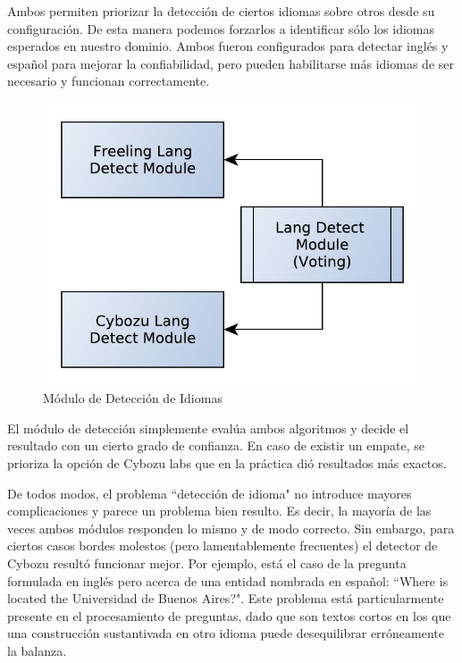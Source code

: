 Ambos permiten priorizar la detección de ciertos idiomas sobre otros desde su configuración.
De esta manera podemos forzarlos a identificar sólo los idiomas esperados en nuestro dominio. 
Ambos fueron configurados para detectar inglés y español para mejorar la confiabilidad,
pero pueden habilitarse más idiomas de ser necesario y funcionan correctamente. 

\begin{figure}
  \centering
    \includegraphics[scale=0.5]{graficos/LangDetect}
  \caption{Módulo de Detección de Idiomas}
  \label{fig:LangDetect}
\end{figure}


El módulo de detección simplemente evalúa ambos algoritmos y 
decide el resultado con un cierto grado de confianza. En caso de existir un empate, se 
prioriza la opción de Cybozu labs que en la práctica dió resultados más exactos.

De todos modos, el problema ``detección de idioma" no introduce mayores complicaciones y parece un problema bien resulto.
Es decir, la mayoría de las veces ambos módulos responden lo mismo y de modo correcto.
Sin embargo, para ciertos casos bordes molestos (pero lamentablemente frecuentes)
el detector de Cybozu resultó funcionar mejor. Por ejemplo, está el caso de la pregunta formulada en inglés pero acerca de una entidad nombrada en español: 
``Where is located the Universidad de Buenos Aires?". Este problema está particularmente presente en el procesamiento de preguntas, dado que son textos cortos en los que una construcción sustantivada en otro idioma puede desequilibrar erróneamente la balanza. 

